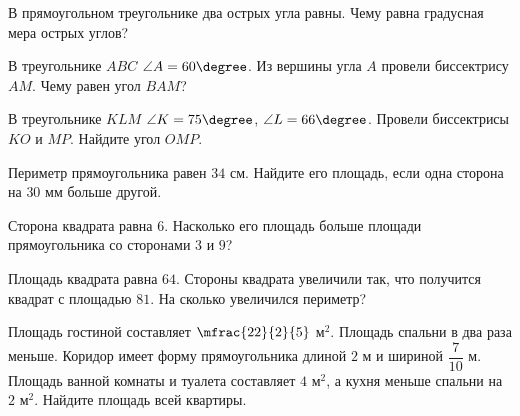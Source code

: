 \begin{class}[number=5]
	\begin{listofex}
		\item В прямоугольном треугольнике два острых угла равны. Чему равна градусная мера острых углов?
		\item В треугольнике \( ABC \) \( \angle A=60\degree \). Из вершины угла \( A \) провели биссектрису \( AM \). Чему равен угол \( BAM \)?
		\item В треугольнике \( KLM \) \( \angle K=75\degree \), \(\angle L=66\degree \). Провели биссектрисы \( KO \) и \( MP \). Найдите угол \( OMP \).
		\item Периметр прямоугольника равен \( 34 \) см. Найдите его площадь, если одна сторона на \( 30 \) мм больше другой.
		\item Сторона квадрата равна \( 6 \). Насколько его площадь больше площади прямоугольника со сторонами \( 3 \) и \( 9 \)?
		\item Площадь квадрата равна \( 64 \). Стороны квадрата увеличили так, что получится квадрат с площадью \( 81 \). На сколько увеличился периметр?
		\item Площадь гостиной составляет \( \mfrac{22}{2}{5} \) м\( ^2 \). Площадь спальни в два раза меньше. Коридор имеет форму прямоугольника длиной \( 2 \) м и шириной \( \dfrac{7}{10} \) м. Площадь ванной комнаты и туалета составляет \( 4 \) м\( ^2 \), а кухня меньше спальни на \( 2 \) м\( ^2 \). Найдите площадь всей квартиры.
		\item {}
	\end{listofex}
\end{class}

